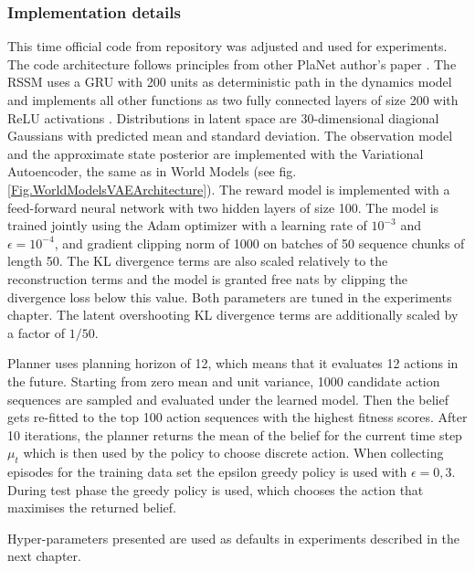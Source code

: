 \subsubsection{Implementation details}

This time official code from repository \cite{Code.PlaNet} was adjusted and used for experiments. The code architecture follows principles from other PlaNet author's paper \cite{Code.TFAgents}.
The RSSM uses a GRU \cite{Algo.GRU} with 200 units as deterministic path in the dynamics model and implements all other functions as two fully connected layers of size 200 with ReLU activations \cite{Algo.ReLU}. Distributions in latent space are 30-dimensional diagional Gaussians with predicted mean and standard deviation.
The observation model and the approximate state posterior are implemented with the Variational Autoencoder, the same as in World Models (see fig.\ref{Fig.WorldModelsVAEArchitecture}). The reward model is implemented with a feed-forward neural network with two hidden layers of size 100.
The model is trained jointly using the Adam optimizer \cite{Algo.Adam} with a learning rate of $10^{-3}$ and $\epsilon = 10^{−4}$, and gradient clipping norm of 1000 on batches of 50 sequence chunks of length 50. The KL divergence terms are also scaled relatively to the reconstruction terms and the model is granted free nats by clipping the divergence loss below this value. Both parameters are tuned in the experiments chapter. The latent overshooting KL divergence terms are additionally scaled by a factor of $1/50$.

Planner uses planning horizon of 12, which means that it evaluates 12 actions in the future. Starting from zero mean and unit variance, 1000 candidate action sequences are sampled and evaluated under the learned model. Then the belief gets re-fitted to the top 100 action sequences with the highest fitness scores. After 10 iterations, the planner returns the mean of the belief for the current time step $\mu_t$ which is then used by the policy to choose discrete action. When collecting episodes for the training data set the epsilon greedy policy is used with $\epsilon = 0,3$. During test phase the greedy policy is used, which chooses the action that maximises the returned belief.

Hyper-parameters presented are used as defaults in experiments described in the next chapter.
